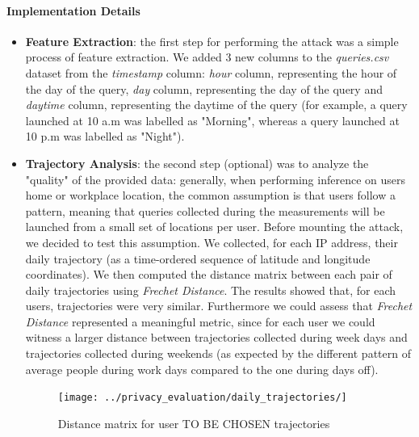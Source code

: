 \documentclass[10pt,conference,compsocconf]{IEEEtran}
\begin{document}
\paragraph{Implementation Details}
\begin{itemize}
    \item \textbf{Feature Extraction}: the first step for performing the attack was a simple process of feature extraction. We added 3 new columns to the \textit{queries.csv} dataset from the \textit{timestamp} column: \textit{hour} column, representing the hour of the day of the query,
    \textit{day} column, representing the day of the query and \textit{daytime} column, representing the
    daytime of the query (for example, a query launched at 10 a.m was labelled as "Morning", whereas a query launched at 10 p.m was labelled as "Night").
    \item \textbf{Trajectory Analysis}: the second step (optional) was to analyze the "quality" of the provided data: generally, when performing inference on users home or workplace location, the common assumption is that users follow a pattern, meaning that queries collected during the measurements will be launched from a small set of locations per user. Before mounting the attack, we decided to test this assumption. We collected, for each IP address, their daily trajectory (as a time-ordered sequence of latitude and longitude coordinates). We then computed the distance matrix between each pair of daily trajectories using \textit{Frechet Distance}.
    The results showed that, for each users, trajectories were very similar. Furthermore we could assess that \textit{Frechet Distance} represented a meaningful metric, since for each user we could witness a larger distance between trajectories collected during week days and trajectories collected during weekends (as expected by the different pattern of average people during work days compared to the one during days off).


    \begin{figure}[h!]
    \texttt{[image: ../privacy\_evaluation/daily\_trajectories/]}
    \caption{Distance matrix for user TO BE CHOSEN trajectories}
    \label{fig:matrix}
    \end{figure}



\end{itemize}
\end{document}
